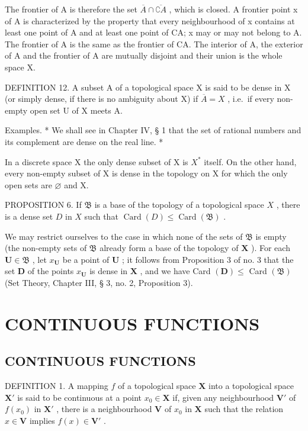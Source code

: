 The frontier of A is therefore the set \(\overline{A} \cap \overline{\complement A}\) , which is closed. A frontier point x of A is characterized by the property that every neighbourhood of x contains at least one point of A and at least one point of CA; x may or may not belong to A. The frontier of A is the same as the frontier of CA. The interior of A, the exterior of A and the frontier of A are mutually disjoint and their union is the whole space X.

DEFINITION 12. A subset A of a topological space X is said to be dense in X (or simply dense, if there is no ambiguity about X) if \(\overline{A} = X\) , i.e.~if every non-empty open set U of X meets A.

Examples. * We shall see in Chapter IV, § 1 that the set of rational numbers and its complement are dense on the real line. *

In a discrete space X the only dense subset of X is \(X^{*}\) itself. On the other hand, every non-empty subset of X is dense in the topology on X for which the only open sets are \(\varnothing\) and X.

PROPOSITION 6. If \(\mathfrak{B}\) is a base of the topology of a topological space \(X\) , there is a dense set \(D\) in \(X\) such that \(\operatorname{Card}(D) \leqslant \operatorname{Card}(\mathfrak{B})\) .

We may restrict ourselves to the case in which none of the sets of \(\mathfrak{B}\) is empty (the non-empty sets of \(\mathfrak{B}\) already form a base of the topology of \(\mathbf{X}\) ). For each \(\mathbf{U} \in \mathfrak{B}\) , let \(x_{\mathbf{U}}\) be a point of \(\mathbf{U}\) ; it follows from Proposition 3 of no. 3 that the set \(\mathbf{D}\) of the points \(x_{\mathbf{U}}\) is dense in \(\mathbf{X}\) , and we have Card \((\mathbf{D}) \leqslant\) Card \((\mathfrak{B})\) (Set Theory, Chapter III, § 3, no. 2, Proposition 3).

\section{CONTINUOUS FUNCTIONS}

\subsection{CONTINUOUS FUNCTIONS}

DEFINITION 1. A mapping \(f\) of a topological space \(\mathbf{X}\) into a topological space \(\mathbf{X}'\) is said to be continuous at a point \(x_0 \in \mathbf{X}\) if, given any neighbourhood \(\mathbf{V}'\) of \(f(x_0)\) in \(\mathbf{X}'\) , there is a neighbourhood \(\mathbf{V}\) of \(x_0\) in \(\mathbf{X}\) such that the relation \(x \in \mathbf{V}\) implies \(f(x) \in \mathbf{V}'\) .

